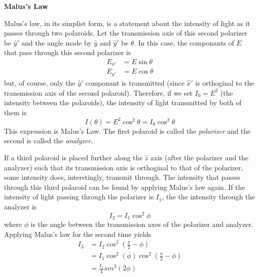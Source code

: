 \documentclass[11pt]{article}
\begin{document}
\begin{multicols}{2}
     \selectfont \textbf{Malus's Law}
    
     \selectfont 

    Malus's law, in its simplist form, is a statement about the intensity of light as it passes through two polaroids. Let the transmission axis of this second polarizer be $\hat{y}'$ and the angle made by $\hat{y}$ and $\hat{y}'$ be $\theta$. In this case, the componants of $E$ that pass through this second polarizer is
    \[
        \begin{split}
            E_{x'} &= E \sin \theta \\
            E_{y'} &= E \cos \theta
        \end{split}
    \]
    but, of course, only the $\hat{y}'$ componant is transmitted (since $\hat{x}'$ is orthoginal to the transmission axis of the second polaroid). Therefore, if we set $I_0 = E^2$ (the intensity between the polaroids), the intensity of light transmitted by both of them is
    \begin{equation}
        \label{MalusLaw}
        I(\theta) = E^2 \cos^2\theta = I_0 \cos^2\theta
    \end{equation}
    This expression is Malus's Law. The first polaroid is called the \textit{polarizer} and the second is called the \textit{analyzer}.

    If a third polaroid is placed further along the $\hat{z}$ axis (after the polarizer and the analyzer) such that its transmission axis is orthoginal to that of the polarizer, some intensity does, interstingly, transmit through. The intensity that passes through this third polaroid can be found by applying Malus's law again. If the intensity of light passing through the polarizer is $I_1$, the the intensity through the analyzer is
    \[
        I_2 = I_1 \cos^2 \phi
    \]
    where $\phi$ is the angle between the transmission axes of the polarizer and analyzer. Applying Malus's law for the second time yields
    \begin{equation}
        \begin{split}
            I_3 &= I_2 \cos^2 (\frac{\pi}{2} - \phi) \\
            &= I_1 \cos^2 (\phi) \cos^2 (\frac{\pi}{2} - \phi) \\
            & = \frac{I_1}{4} sin^2 (2 \phi) \label{MalusLaw3}
        \end{split}
    \end{equation}

    \vspace{20pt}


\end{multicols}
\end{document}
